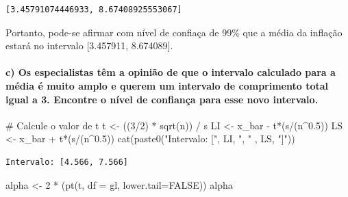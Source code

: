 \documentclass[
  letterpaper,
  DIV=11,
  numbers=noendperiod]{scrartcl}
\let\oldparagraph\paragraph
\renewcommand{\paragraph}[1]{\oldparagraph{#1}\mbox{}}
\newenvironment{Shaded}{\begin{snugshade}}{\end{snugshade}}
\newcommand{\AttributeTok}[1]{\textcolor[rgb]{0.40,0.45,0.13}{#1}}
\newcommand{\CommentTok}[1]{\textcolor[rgb]{0.37,0.37,0.37}{#1}}
\newcommand{\ConstantTok}[1]{\textcolor[rgb]{0.56,0.35,0.01}{#1}}
\newcommand{\DecValTok}[1]{\textcolor[rgb]{0.68,0.00,0.00}{#1}}
\newcommand{\FloatTok}[1]{\textcolor[rgb]{0.68,0.00,0.00}{#1}}
\newcommand{\FunctionTok}[1]{\textcolor[rgb]{0.28,0.35,0.67}{#1}}
\newcommand{\NormalTok}[1]{\textcolor[rgb]{0.00,0.23,0.31}{#1}}
\newcommand{\OtherTok}[1]{\textcolor[rgb]{0.00,0.23,0.31}{#1}}
\newcommand{\SpecialCharTok}[1]{\textcolor[rgb]{0.37,0.37,0.37}{#1}}
\newcommand{\StringTok}[1]{\textcolor[rgb]{0.13,0.47,0.30}{#1}}
\begin{document}
\begin{verbatim}
[3.45791074446933, 8.67408925553067]
\end{verbatim}

Portanto, pode-se afirmar com nível de confiaça de 99\% que a média da
inflação estará no intervalo {[}3.457911, 8.674089{]}.

\hypertarget{c-os-especialistas-tuxeam-a-opiniuxe3o-de-que-o-intervalo-calculado-para-a-muxe9dia-uxe9-muito-amplo-e-querem-um-intervalo-de-comprimento-total-igual-a-3.-encontre-o-nuxedvel-de-confianuxe7a-para-esse-novo-intervalo.}{%
\paragraph{c) Os especialistas têm a opinião de que o intervalo
calculado para a média é muito amplo e querem um intervalo de
comprimento total igual a 3. Encontre o nível de confiança para esse
novo
intervalo.}\label{c-os-especialistas-tuxeam-a-opiniuxe3o-de-que-o-intervalo-calculado-para-a-muxe9dia-uxe9-muito-amplo-e-querem-um-intervalo-de-comprimento-total-igual-a-3.-encontre-o-nuxedvel-de-confianuxe7a-para-esse-novo-intervalo.}}

\begin{Shaded}
\begin{Highlighting}[]
\CommentTok{\# Calcule o valor de t}
\NormalTok{t }\OtherTok{\textless{}{-}}\NormalTok{ ((}\DecValTok{3}\SpecialCharTok{/}\DecValTok{2}\NormalTok{) }\SpecialCharTok{*} \FunctionTok{sqrt}\NormalTok{(n)) }\SpecialCharTok{/}\NormalTok{ s}
\NormalTok{LI }\OtherTok{\textless{}{-}}\NormalTok{ x\_bar }\SpecialCharTok{{-}}\NormalTok{ t}\SpecialCharTok{*}\NormalTok{(s}\SpecialCharTok{/}\NormalTok{(n}\SpecialCharTok{\^{}}\FloatTok{0.5}\NormalTok{))}
\NormalTok{LS }\OtherTok{\textless{}{-}}\NormalTok{ x\_bar }\SpecialCharTok{+}\NormalTok{ t}\SpecialCharTok{*}\NormalTok{(s}\SpecialCharTok{/}\NormalTok{(n}\SpecialCharTok{\^{}}\FloatTok{0.5}\NormalTok{))}
\FunctionTok{cat}\NormalTok{(}\FunctionTok{paste0}\NormalTok{(}\StringTok{"Intervalo: ["}\NormalTok{, LI, }\StringTok{", "}\NormalTok{ , LS, }\StringTok{"]"}\NormalTok{))}
\end{Highlighting}
\end{Shaded}

\begin{verbatim}
Intervalo: [4.566, 7.566]
\end{verbatim}

\begin{Shaded}
\begin{Highlighting}[]
\NormalTok{alpha }\OtherTok{\textless{}{-}} \DecValTok{2} \SpecialCharTok{*}\NormalTok{ (}\FunctionTok{pt}\NormalTok{(t, }\AttributeTok{df =}\NormalTok{ gl, }\AttributeTok{lower.tail=}\ConstantTok{FALSE}\NormalTok{))}
\NormalTok{alpha}
\end{Highlighting}
\end{Shaded}
\end{document}

